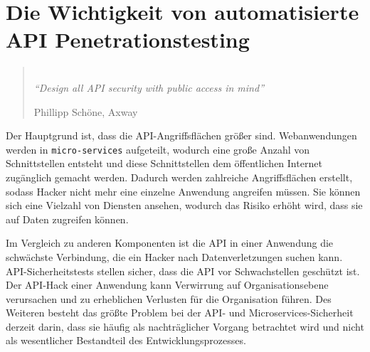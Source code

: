 \newpage

\section{Die Wichtigkeit von automatisierte API Penetrationstesting}

\begin{quote}
	\emph{\\
		"`Design all API security with public access in mind"'}
	\begin{flushright}
		Phillipp Schöne, Axway
	\end{flushright}
\end{quote}

Der Hauptgrund ist, dass die API-Angriffsflächen größer sind. Webanwendungen werden in \texttt{micro-services} aufgeteilt, wodurch eine große Anzahl von Schnittstellen entsteht und diese Schnittstellen dem öffentlichen Internet zugänglich gemacht werden. Dadurch werden zahlreiche Angriffsflächen erstellt, sodass Hacker nicht mehr eine einzelne Anwendung angreifen müssen. Sie können sich eine Vielzahl von Diensten ansehen, wodurch das Risiko erhöht wird, dass sie auf Daten zugreifen können\cite{mswv17}. 

Im Vergleich zu anderen Komponenten ist die API in einer Anwendung die schwächste Verbindung, die ein Hacker nach Datenverletzungen suchen kann. API-Sicherheitstests stellen sicher, dass die API vor Schwachstellen geschützt ist. Der API-Hack einer Anwendung kann Verwirrung auf Organisationsebene verursachen und zu erheblichen Verlusten für die Organisation führen\cite{whyvriticalapi17}. Des Weiteren besteht das größte Problem bei der API- und Microservices-Sicherheit derzeit darin, dass sie häufig als nachträglicher Vorgang betrachtet wird und nicht als wesentlicher Bestandteil des Entwicklungsprozesses\cite{anthonyart18}.

